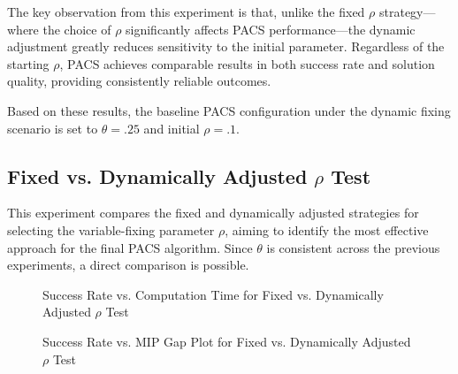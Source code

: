 The key observation from this experiment is that, unlike the fixed $\rho$ strategy—where the choice of $\rho$ significantly affects PACS performance—the dynamic adjustment greatly reduces sensitivity to the initial parameter. Regardless of the starting $\rho$, PACS achieves comparable results in both success rate and solution quality, providing consistently reliable outcomes.

Based on these results, the baseline PACS configuration under the dynamic fixing scenario is set to $\theta = .25$ and initial $\rho = .1$.

\subsection{Fixed vs. Dynamically Adjusted $\rho$ Test}\label{sec:test_fixvsdyn_rho}
This experiment compares the fixed and dynamically adjusted strategies for selecting the variable-fixing parameter $\rho$, aiming to identify the most effective approach for the final PACS algorithm. Since $\theta$ is consistent across the previous experiments, a direct comparison is possible.

\begin{figure}[H]
\centering
\begin{minipage}{0.6\columnwidth}
\centering
\resizebox{\linewidth}{!}{}
\end{minipage}%
\hfill
\begin{minipage}{0.4\columnwidth}
\centering
\resizebox{\linewidth}{!}{}
\end{minipage}
\caption{Success Rate vs. Computation Time for Fixed vs. Dynamically Adjusted $\rho$ Test}
\label{fig:PACS_STD_DYN_SuccRate}
\end{figure}

\begin{figure}[H]
\centering
\begin{minipage}{0.6\columnwidth}
\centering
\resizebox{\linewidth}{!}{}
\end{minipage}%
\hfill
\begin{minipage}{0.4\columnwidth}
\centering
\resizebox{\linewidth}{!}{}
\end{minipage}
\caption{Success Rate vs. MIP Gap Plot for Fixed vs. Dynamically Adjusted $\rho$ Test}
\label{fig:PACS_STD_DYN_MGAP}
\end{figure}

